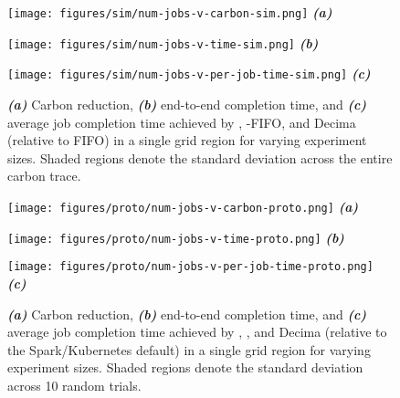 \begin{figure*}[h]
\begin{minipage}{0.32\linewidth}
        \centering
    \texttt{[image: figures/sim/num-jobs-v-carbon-sim.png]} \vspace{-1em}
    {\centering \textbf{\textit{(a)}}}
\end{minipage} \hfill
\begin{minipage}{0.32\linewidth}
        \centering
    \texttt{[image: figures/sim/num-jobs-v-time-sim.png]} \vspace{-1em}
    {\centering \textbf{\textit{(b)}}}
\end{minipage} \hfill
\begin{minipage}{0.32\linewidth}
        \centering
    \texttt{[image: figures/sim/num-jobs-v-per-job-time-sim.png]} \vspace{-1em}
    {\centering \textbf{\textit{(c)}}}
\end{minipage}
\caption{  \textbf{\textit{(a)}} Carbon reduction, \textbf{\textit{(b)}} end-to-end completion time, and \textbf{\textit{(c)}} average job completion time achieved by \DANISH, \CAP-FIFO, and Decima (relative to FIFO) in a single grid region for varying experiment sizes.  Shaded regions denote the standard deviation across the entire carbon trace.  } \label{fig:num-jobs-sim}
\end{figure*}
\begin{figure*}[h]
\begin{minipage}{0.32\linewidth}
        \centering
    \texttt{[image: figures/proto/num-jobs-v-carbon-proto.png]} \vspace{-1em}
    {\centering \textbf{\textit{(a)}}}
\end{minipage} \hfill
\begin{minipage}{0.32\linewidth}
        \centering
    \texttt{[image: figures/proto/num-jobs-v-time-proto.png]} \vspace{-1em}
    {\centering \textbf{\textit{(b)}}}
\end{minipage} \hfill
\begin{minipage}{0.32\linewidth}
        \centering
    \texttt{[image: figures/proto/num-jobs-v-per-job-time-proto.png]} \vspace{-1em}
    {\centering \textbf{\textit{(c)}}}
\end{minipage} 
\caption{ \textbf{\textit{(a)}} Carbon reduction, \textbf{\textit{(b)}} end-to-end completion time, and \textbf{\textit{(c)}} average job completion time achieved by \DANISH, \CAP, and Decima (relative to the Spark/Kubernetes default) in a single grid region for varying experiment sizes.  Shaded regions denote the standard deviation across 10 random trials. } \label{fig:num-jobs-proto}
\end{figure*}

